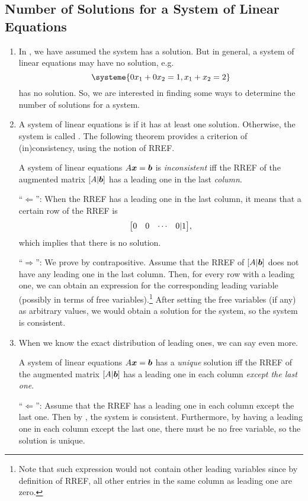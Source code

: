 \subsection{Number of Solutions for a System of Linear Equations}
\label{subsect:sys-sol-num}
\begin{enumerate}
\item In , we have assumed the system has a
solution. But in general, a system of linear equations may have no solution,
e.g.
\[
\systeme{0x_1+0x_2=1,
x_1+x_2=2}
\]
has no solution. So, we are interested in finding some ways to determine the
number of solutions for a system.

\item A system of linear equations is  if it has at least one
solution. Otherwise, the system is called . The following
theorem provides a criterion of (in)consistency, using the notion of RREF.

\begin{theorem}
\label{thm:consist-criterion}
A system of linear equations \(A\vb*{x}=\vb*{b}\) is \emph{inconsistent} iff
the RREF of the augmented matrix \([A|\vb*{b}]\) has a leading one in the last
\emph{column}.
\end{theorem}
\begin{pf}
``\(\Leftarrow\)'': When the RREF has a leading one in the last column, it
means that a certain row of the RREF is
\[
\mqty[0&0&\cdots&0|1],
\]
which implies that there is no solution.

``\(\Rightarrow\)'': We prove by contrapositive. Assume that the RREF of
\([A|\vb*{b}]\) does not have any leading one in the last column. Then, for
every row with a leading one, we can obtain an expression for the corresponding
leading variable (possibly in terms of free variables).\footnote{Note that such
expression would not contain other leading variables since by definition of
RREF, all other entries in the same column as leading one are zero.} After
setting the free variables (if any) as arbitrary values, we would obtain a
solution for the system, so the system is consistent.
\end{pf}

\item When we know the exact distribution of leading ones, we can say even
more.
\begin{corollary}
\label{cor:unique-criterion}
A system of linear equations \(A\vb*{x}=\vb*{b}\) has a \emph{unique}
solution iff the RREF of the augmented matrix \([A|\vb*{b}]\) has a leading
one in each column \emph{except the last one}.
\end{corollary}
\begin{pf}
``\(\Leftarrow\)'': Assume that the RREF has a leading one in each column
except the last one. Then by , the system is
consistent. Furthermore, by having a leading one in each column except the
last one, there must be no free variable, so the solution is unique.


\end{pf}
\end{enumerate}
